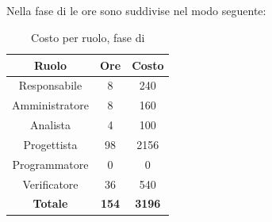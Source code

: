 \subsection{\PD}
Nella fase di \PD le ore sono suddivise nel modo seguente:
\begin{table}[H]
	\centering
	\begin{tabular}{|c|c|c|}
		\hline
		\textbf{Ruolo} &
		\textbf{Ore} &
		\textbf{Costo} \\
		\hline
		Responsabile & 8 & 240 \\
		\hline
		Amministratore & 8 & 160 \\
		\hline
		Analista & 4 & 100\\
		\hline
		Progettista & 98 & 2156 \\
		\hline
		Programmatore & 0 & 0 \\
		\hline
		Verificatore & 36 & 540 \\
		\hline
		\textbf{Totale} & \textbf{154} & \textbf{3196} \\
		\hline
	\end{tabular}
	\caption{Costo per ruolo, fase di \PD}
\end{table}

